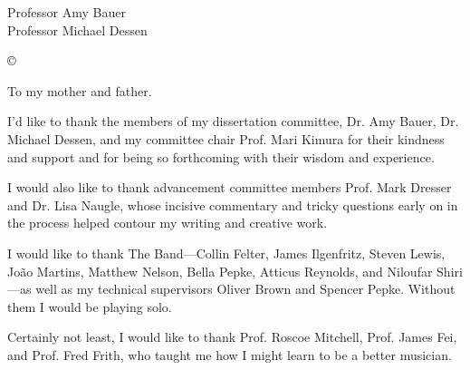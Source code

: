 




\othercommitteemembers
{
  Professor Amy Bauer\\
  Professor Michael Dessen
}


\copyrightdeclaration
{
  {\copyright} {\Degreeyear} \Authorname
}


\dedications
{
  To my mother and father.
}

\acknowledgments
{    
    I'd like to thank the members of my dissertation committee, Dr. Amy Bauer, Dr. Michael Dessen, and my committee chair Prof. Mari Kimura for their kindness and support and for being so forthcoming with their wisdom and experience.

    I would also like to thank advancement committee members Prof. Mark Dresser and Dr. Lisa Naugle, whose incisive commentary and tricky questions early on in the process helped contour my writing and creative work.

    I would like to thank The Band---Collin Felter, James Ilgenfritz, Steven Lewis, Jo\~{a}o Martins, Matthew Nelson, Bella Pepke, Atticus Reynolds, and Niloufar Shiri---as well as my technical supervisors Oliver Brown and Spencer Pepke. Without them I would be playing solo. 

    Certainly not least, I would like to thank Prof. Roscoe Mitchell, Prof. James Fei, and Prof. Fred Frith, who taught me how I might learn to be a better musician.
}


